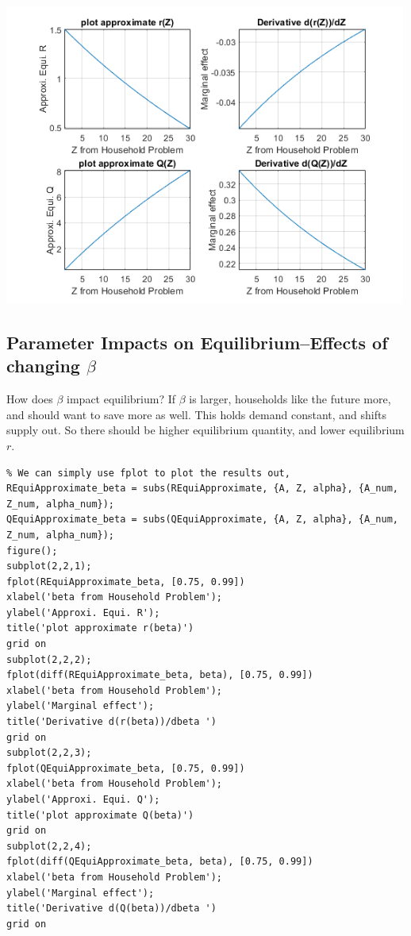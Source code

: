 \documentclass[
]{book}
\begin{document}
\includegraphics[width=5.20833in,height=\textheight]{img/demand_supply_taylor_approximate_capital_images/figure_2.png}

\hypertarget{parameter-impacts-on-equilibriumeffects-of-changing-beta}{%
\subsection{\texorpdfstring{Parameter Impacts on Equilibrium--Effects of changing \(\beta\)}{Parameter Impacts on Equilibrium--Effects of changing \textbackslash beta}}\label{parameter-impacts-on-equilibriumeffects-of-changing-beta}}

How does \(\beta\) impact equilibrium? If \(\beta\) is larger, households
like the future more, and should want to save more as well. This holds
demand constant, and shifts supply out. So there should be higher
equilibrium quantity, and lower equilibrium \(r\).

\begin{verbatim}
% We can simply use fplot to plot the results out, 
REquiApproximate_beta = subs(REquiApproximate, {A, Z, alpha}, {A_num, Z_num, alpha_num});
QEquiApproximate_beta = subs(QEquiApproximate, {A, Z, alpha}, {A_num, Z_num, alpha_num});
figure();
subplot(2,2,1);
fplot(REquiApproximate_beta, [0.75, 0.99])
xlabel('beta from Household Problem');
ylabel('Approxi. Equi. R');
title('plot approximate r(beta)')
grid on
subplot(2,2,2);
fplot(diff(REquiApproximate_beta, beta), [0.75, 0.99])
xlabel('beta from Household Problem');
ylabel('Marginal effect');
title('Derivative d(r(beta))/dbeta ')
grid on
subplot(2,2,3);
fplot(QEquiApproximate_beta, [0.75, 0.99])
xlabel('beta from Household Problem');
ylabel('Approxi. Equi. Q');
title('plot approximate Q(beta)')
grid on
subplot(2,2,4);
fplot(diff(QEquiApproximate_beta, beta), [0.75, 0.99])
xlabel('beta from Household Problem');
ylabel('Marginal effect');
title('Derivative d(Q(beta))/dbeta ')
grid on
\end{verbatim}
\end{document}
